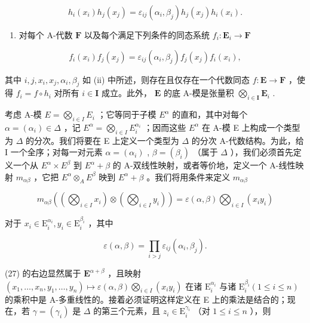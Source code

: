 \[
h _ {i} (x _ {i}) h _ {j} (x _ {j}) = \varepsilon_ {i j} (\alpha_ {i}, \beta_ {j}) h _ {j} (x _ {j}) h _ {i} (x _ {i}).\tag{25}
\]

\begin{enumerate}
\def\labelenumi{(\roman{enumi})}
\setcounter{enumi}{2}
\tightlist
\item
  对每个 A-代数 \(\mathbf{F}\) 以及每个满足下列条件的同态系统 \(f_{i}:\mathbf{E}_{i}\to \mathbf{F}\)
\end{enumerate}

\[
f _ {i} (x _ {i}) f _ {j} (x _ {j}) = \varepsilon_ {i j} (\alpha_ {i}, \beta_ {j}) f _ {j} (x _ {j}) f _ {i} (x _ {i}),\tag{26}
\]

其中 \(i, j, x_i, x_j, \alpha_i, \beta_j\) 如 (ii) 中所述，则存在且仅存在一个代数同态 \(f: \mathbf{E} \to \mathbf{F}\) ，使得 \(f_i = f \circ h_i\) 对所有 \(i \in \mathbf{I}\) 成立。此外， \(\mathbf{E}\) 的底 A-模是张量积 \(\bigotimes_{i \in \mathbf{I}} \mathbf{E}_i\) .

考虑 A-模 \(E = \bigotimes_{i \in I} E_i\) ；它等同于子模 \(E^\alpha\) 的直和，其中对每个 \(\alpha = (\alpha_i) \in \Delta\) ，记 \(E^\alpha = \bigotimes_{i \in I} E_i^{\alpha_i}\) ；因而这些 \(E^\alpha\) 在 A-模 E 上构成一个类型为 \(\Delta\) 的分次。我们将要在 E 上定义一个类型为 \(\Delta\) 的分次 A-代数结构。为此，给 I 一个全序；对每一对元素 \(\alpha = (\alpha_i)\) , \(\beta = (\beta_i)\) （属于 \(\Delta\) ），我们必须首先定义一个从 \(E^\alpha \times E^\beta\) 到 \(E^\alpha + \beta\) 的 A-双线性映射，或者等价地，定义一个 A-线性映射 \(m_{\alpha\beta}\) ，它把 \(E^\alpha \otimes_A E^\beta\) 映到 \(E^\alpha + \beta\) 。我们将用条件来定义 \(m_{\alpha\beta}\)

\[
m _ {\alpha \beta} \left(\left(\bigotimes_ {i \in I} x _ {i}\right) \otimes \left(\bigotimes_ {i \in I} y _ {i}\right)\right) = \varepsilon (\alpha , \beta) \bigotimes_ {i \in I} (x _ {i} y _ {i})\tag{27}
\]

对于 \(x_{i}\in \mathrm{E}_{i}^{\alpha_{i}},y_{i}\in \mathrm{E}_{i}^{\beta_{i}}\) ，其中

\[
\varepsilon (\alpha , \beta) = \prod_ {i > j} \varepsilon_ {i j} (\alpha_ {i}, \beta_ {j}).\tag{28}
\]

(27) 的右边显然属于 \(\mathbf{E}^{\alpha +\beta}\) ，且映射 \((x_{1},\ldots ,x_{n},y_{1},\ldots ,y_{n})\mapsto \varepsilon (\alpha ,\beta)\bigotimes_{i\in I}(x_{i}y_{i})\) 在诸 \(\mathrm{E}_i^{\alpha_i}\) 与诸 \(\mathrm{E}_i^{\beta_i}(1\leqslant i\leqslant n)\) 的乘积中是 A-多重线性的。接着必须证明这样定义在 E 上的乘法是结合的；现在，若 \(\gamma = (\gamma_{i})\) 是 \(\Delta\) 的第三个元素，且 \(z_{i} \in \mathrm{E}_{i}^{\gamma_{i}}\) （对 \(1 \leqslant i \leqslant n\) ），则

